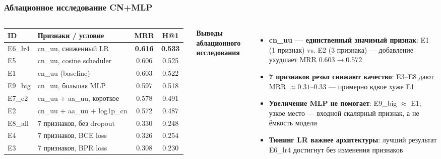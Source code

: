 \documentclass[aspectratio=169]{beamer}
\begin{document}
\begin{frame}
  \frametitle{Аблационное исследование CN+MLP}
  \begin{columns}[T]
    \centering
    \small
    \begin{tabular}{llcc}
      \toprule
      \textbf{ID} & \textbf{Признаки / условие} & \textbf{MRR} & \textbf{H@1} \\
      \midrule
      E6\_lr4 & cn\_uu, сниженный LR & \textbf{0.616} & \textbf{0.533} \\
      E5 & cn\_uu, cosine scheduler & 0.606 & 0.525 \\
      E1 & cn\_uu (baseline) & 0.603 & 0.522 \\
      E9\_big & cn\_uu, большая MLP & 0.597 & 0.518 \\
      E7\_e2 & cn\_uu + aa\_uu, короткое & 0.578 & 0.491 \\
      E2 & cn\_uu + aa\_uu + log1p\_cn & 0.572 & 0.487 \\
      E8\_all & 7 признаков, без dropout & 0.330 & 0.248 \\
      E4 & 7 признаков, BCE loss & 0.326 & 0.254 \\
      E3 & 7 признаков, BPR loss & 0.308 & 0.230 \\
      \bottomrule
    \end{tabular}
    \textbf{Выводы аблационного исследования}
    \begin{itemize}
      \item \textbf{cn\_uu — единственный значимый признак}: E1 (1 признак) vs. E2 (3 признака) — добавление ухудшает MRR $0.603 \to 0.572$
      \item \textbf{7 признаков резко снижают качество}: E3–E8 дают MRR $\approx 0.31$–$0.33$ — примерно вдвое хуже E1
      \item \textbf{Увеличение MLP не помогает}: E9\_big $\approx$ E1; узкое место — входной скалярный признак, а не ёмкость модели
      \item \textbf{Тюнинг LR важнее архитектуры}: лучший результат E6\_lr4 достигнут без изменения признаков
    \end{itemize}
  \end{columns}
\end{frame}

\end{document}
